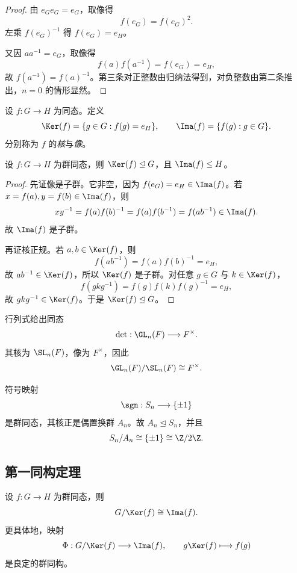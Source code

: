 \begin{proof}
由 $e_Ge_G=e_G$，取像得
\[
 f(e_G)=f(e_G)^2.
\]
左乘 $f(e_G)^{-1}$ 得 $f(e_G)=e_H$。

又因 $aa^{-1}=e_G$，取像得
\[
 f(a)f(a^{-1})=f(e_G)=e_H,
\]
故 $f(a^{-1})=f(a)^{-1}$。第三条对正整数由归纳法得到，对负整数由第二条推出，$n=0$ 的情形显然。
\end{proof}

\begin{definition}
设 $f:G\to H$ 为同态。定义
\[
\Ker(f)=\{g\in G:f(g)=e_H\}, \qquad \Ima(f)=\{f(g):g\in G\}.
\]
分别称为 $f$ 的\emph{核}与\emph{像}。
\end{definition}

\begin{proposition}
设 $f:G\to H$ 为群同态，则 $\Ker(f)\trianglelefteq G$，且 $\Ima(f)\le H$。
\end{proposition}

\begin{proof}
先证像是子群。它非空，因为 $f(e_G)=e_H\in \Ima(f)$。若 $x=f(a),y=f(b)\in \Ima(f)$，则
\[
 xy^{-1}=f(a)f(b)^{-1}=f(a)f(b^{-1})=f(ab^{-1}) \in \Ima(f).
\]
故 $\Ima(f)$ 是子群。

再证核正规。若 $a,b\in \Ker(f)$，则
\[
 f(ab^{-1})=f(a)f(b)^{-1}=e_H,
\]
故 $ab^{-1}\in \Ker(f)$，所以 $\Ker(f)$ 是子群。对任意 $g\in G$ 与 $k\in \Ker(f)$，
\[
 f(gkg^{-1})=f(g)f(k)f(g)^{-1}=e_H,
\]
故 $gkg^{-1}\in \Ker(f)$。于是 $\Ker(f)\trianglelefteq G$。
\end{proof}

\begin{example}[行列式同态]
行列式给出同态
\[
 \det:\GL_n(F) \longrightarrow F^\times.
\]
其核为 $\SL_n(F)$，像为 $F^\times$，因此
\[
 \GL_n(F)/\SL_n(F) \cong F^\times.
\]
\end{example}

\begin{example}[符号同态]
符号映射
\[
 \sgn:S_n \longrightarrow \{\pm 1\}
\]
是群同态，其核正是偶置换群 $A_n$。故 $A_n\trianglelefteq S_n$，并且
\[
 S_n/A_n \cong \{\pm1\} \cong \Z/2\Z.
\]
\end{example}

\subsection*{第一同构定理}

\begin{theorem}[第一同构定理]
设 $f:G\to H$ 为群同态，则
\[
 G/\Ker(f) \cong \Ima(f).
\]
更具体地，映射
\[
 \Phi:G/\Ker(f) \longrightarrow \Ima(f), \qquad g\Ker(f) \longmapsto f(g)
\]
是良定的群同构。
\end{theorem}

